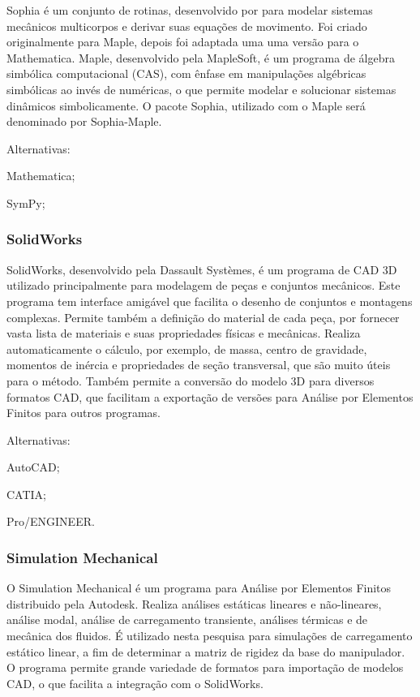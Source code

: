 Sophia é um conjunto de rotinas, desenvolvido por \citet{lesser1995analysis}
para modelar sistemas mecânicos multicorpos e derivar suas equações de
movimento. Foi criado originalmente para Maple, depois foi adaptada uma uma
versão para o Mathematica.
Maple\cite{maple}, desenvolvido pela MapleSoft, é um programa de álgebra
simbólica computacional (CAS), com ênfase em manipulações algébricas simbólicas
ao invés de numéricas, o que permite modelar e solucionar sistemas dinâmicos
simbolicamente. O pacote Sophia, utilizado com o Maple será denominado por
Sophia-Maple.

Alternativas:
%
\begin{enumerate*}
	\item Mathematica;
	\item SymPy;
\end{enumerate*}

\subsubsection{SolidWorks}

SolidWorks\cite{solidworks}, desenvolvido pela Dassault Systèmes, é um programa
de CAD 3D utilizado principalmente para modelagem de peças e conjuntos mecânicos.
Este programa tem interface amigável que facilita o desenho de conjuntos e
montagens complexas. Permite também a definição do material de cada peça, por
fornecer vasta lista de materiais e suas propriedades físicas e mecânicas.
Realiza automaticamente o cálculo, por exemplo, de massa, centro de
gravidade, momentos de inércia e propriedades de seção transversal, que são
muito úteis para o método. Também permite a conversão do modelo 3D para diversos
formatos CAD, que facilitam a exportação de versões para Análise por Elementos
Finitos para outros programas.

Alternativas:
%
\begin{enumerate*}
	\item AutoCAD;
	\item CATIA;
	\item Pro/ENGINEER.
\end{enumerate*}

\subsubsection{Simulation Mechanical}

O Simulation Mechanical\cite{autodesk} é um programa para Análise por Elementos
Finitos distribuido pela Autodesk.  Realiza análises estáticas lineares e não-lineares,
análise modal, análise de carregamento transiente, análises térmicas e de
mecânica dos fluidos.
É utilizado nesta pesquisa para simulações de carregamento estático linear, a
fim de determinar a matriz de rigidez da base do manipulador. O programa permite
grande variedade de formatos para importação de modelos CAD, o que facilita a
integração com o SolidWorks.

